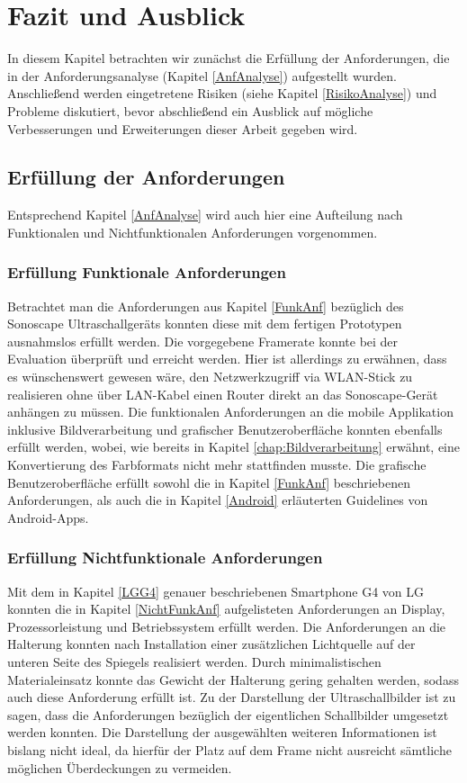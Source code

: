 \chapter{Fazit und Ausblick}
In diesem Kapitel betrachten wir zunächst die Erfüllung der Anforderungen, die in der Anforderungsanalyse (Kapitel \ref{AnfAnalyse}) aufgestellt wurden. Anschließend werden eingetretene Risiken (siehe Kapitel \ref{RisikoAnalyse}) und Probleme diskutiert, bevor abschließend ein Ausblick auf mögliche Verbesserungen und Erweiterungen dieser Arbeit gegeben wird.
\section{Erfüllung der Anforderungen}
Entsprechend Kapitel \ref{AnfAnalyse} wird auch hier eine Aufteilung nach Funktionalen und Nichtfunktionalen Anforderungen vorgenommen.
\subsection{Erfüllung Funktionale Anforderungen}
Betrachtet man die Anforderungen aus Kapitel \ref{FunkAnf} bezüglich des Sonoscape Ultraschallgeräts konnten diese mit dem fertigen Prototypen ausnahmslos erfüllt werden. Die vorgegebene Framerate konnte bei der Evaluation überprüft und erreicht werden. Hier ist allerdings zu erwähnen, dass es wünschenswert gewesen wäre, den Netzwerkzugriff via WLAN-Stick zu realisieren ohne über LAN-Kabel einen Router direkt an das Sonoscape-Gerät anhängen zu müssen. Die funktionalen Anforderungen an die mobile Applikation inklusive Bildverarbeitung und grafischer Benutzeroberfläche konnten ebenfalls erfüllt werden, wobei, wie bereits in Kapitel \ref{chap:Bildverarbeitung} erwähnt, eine Konvertierung des Farbformats nicht mehr stattfinden musste. Die grafische Benutzeroberfläche erfüllt sowohl die in Kapitel \ref{FunkAnf} beschriebenen Anforderungen, als auch die in Kapitel \ref{Android} erläuterten Guidelines von Android-Apps.
\subsection{Erfüllung Nichtfunktionale Anforderungen}
Mit dem in Kapitel \ref{LGG4} genauer beschriebenen Smartphone G4 von LG konnten die in Kapitel \ref{NichtFunkAnf} aufgelisteten Anforderungen an Display, Prozessorleistung und Betriebssystem erfüllt werden. Die Anforderungen an die Halterung konnten nach Installation einer zusätzlichen Lichtquelle auf der unteren Seite des Spiegels realisiert werden. Durch minimalistischen Materialeinsatz konnte das Gewicht der Halterung gering gehalten werden, sodass auch diese Anforderung erfüllt ist. Zu der Darstellung der Ultraschallbilder ist zu sagen, dass die Anforderungen bezüglich der eigentlichen Schallbilder umgesetzt werden konnten. Die Darstellung der ausgewählten weiteren Informationen ist bislang nicht ideal, da hierfür der Platz auf dem Frame nicht ausreicht sämtliche möglichen Überdeckungen zu vermeiden.
